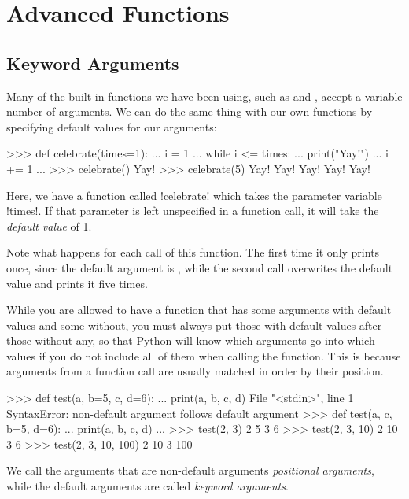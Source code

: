 \documentclass[11pt]{cselabheader}
\begin{document}
{\pagebreak
\section{Advanced Functions}
\label{sec:adv}

\subsection{Keyword Arguments}
\label{subsec:adv.args}

Many of the built-in functions we have been using, such as 
and , accept a variable number of arguments. We can do the
same thing with our own functions by specifying default values for our
arguments:

\begin{pyconcode}
>>> def celebrate(times=1):
...     i = 1
...     while i <= times:
...         print("Yay!")
...         i += 1
...
>>> celebrate()
Yay!
>>> celebrate(5)
Yay!
Yay!
Yay!
Yay!
Yay!
\end{pyconcode}

Here, we have a function called \pythoninline!celebrate! which takes the
parameter variable \pythoninline!times!. If that parameter is left unspecified
in a function call, it will take the \emph{default value} of 1.

Note what happens for each call of this function. The first time it only prints
 once, since the default argument is ,
while the second call overwrites the default value and prints it five times.

While you are allowed to have a function that has some arguments with default
values and some without, you must always put those with default values after
those without any, so that Python will know which arguments go into which values
if you do not include all of them when calling the function. This is because
arguments from a function call are usually matched in order by their position.

\begin{pyconcode}
>>> def test(a, b=5, c, d=6):
...     print(a, b, c, d)
  File "<stdin>", line 1
SyntaxError: non-default argument follows default argument
>>> def test(a, c, b=5, d=6):
...     print(a, b, c, d)
...
>>> test(2, 3)
2 5 3 6
>>> test(2, 3, 10)
2 10 3 6
>>> test(2, 3, 10, 100)
2 10 3 100
\end{pyconcode}

We call the arguments that are non-default arguments \emph{positional
arguments}, while the default arguments are called \emph{keyword arguments}.

}
\end{document}
